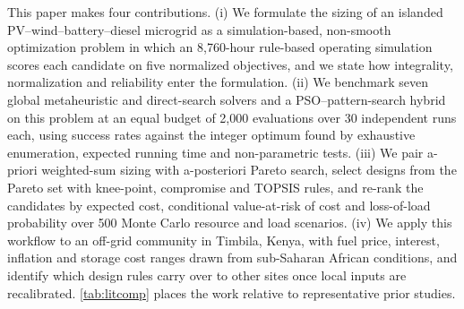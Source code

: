 \documentclass[final,3p,times]{elsarticle}
\begin{document}
This paper makes four contributions. (i) We formulate the sizing of an islanded PV--wind--battery--diesel microgrid as a simulation-based, non-smooth optimization problem in which an 8,760-hour rule-based operating simulation scores each candidate on five normalized objectives, and we state how integrality, normalization and reliability enter the formulation. (ii) We benchmark seven global metaheuristic and direct-search solvers and a PSO--pattern-search hybrid on this problem at an equal budget of 2,000 evaluations over 30 independent runs each, using success rates against the integer optimum found by exhaustive enumeration, expected running time and non-parametric tests. (iii) We pair a-priori weighted-sum sizing with a-posteriori Pareto search, select designs from the Pareto set with knee-point, compromise and TOPSIS rules, and re-rank the candidates by expected cost, conditional value-at-risk of cost and loss-of-load probability over 500 Monte Carlo resource and load scenarios. (iv) We apply this workflow to an off-grid community in Timbila, Kenya, with fuel price, interest, inflation and storage cost ranges drawn from sub-Saharan African conditions, and identify which design rules carry over to other sites once local inputs are recalibrated. \cref{tab:litcomp} places the work relative to representative prior studies.
\end{document}
